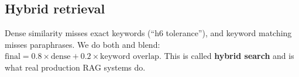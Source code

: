 \documentclass[11pt,a4paper]{article}
\begin{document}
\subsection{Hybrid retrieval}
Dense similarity misses exact keywords (``h6 tolerance''), and keyword matching misses
paraphrases. We do both and blend: $\text{final} = 0.8 \times \text{dense} + 0.2
\times \text{keyword overlap}$. This is called \textbf{hybrid search} and is what real
production RAG systems do.


\end{document}
